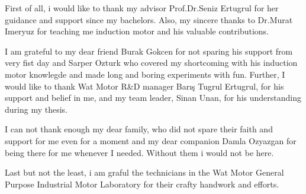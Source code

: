 \vspace*{-6pt}

First of all, i would like to thank my advisor Prof.Dr.Seniz Ertugrul for her guidance and support since my bachelors. Also, my sincere thanks to Dr.Murat Imeryuz for teaching me induction motor and his valuable contributions.

I am grateful to my dear friend Burak Gokcen for not sparing his support from very fist day and Sarper Ozturk who covered my shortcoming with his induction motor knowlegde and made long and boring experiments with fun.
Further, I would like to thank Wat Motor R\&D manager Barış Tugrul Ertugrul, for his support and belief in me, and my team leader, Sinan Unan, for his understanding during my thesis.

I can not thank enough my dear family, who did not spare their faith and support for me even for a moment and my dear companion Damla Ozyazgan for being there for me whenever I needed. Without them i would not be here.

Last but not the least, i am graful the technicians in the Wat Motor General Purpose Industrial Motor Laboratory for their crafty handwork and efforts.